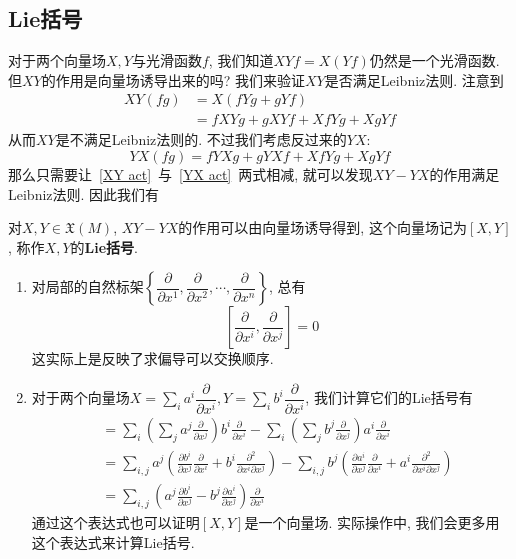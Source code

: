 \subsection*{Lie括号}
对于两个向量场$X,Y$与光滑函数$f$, 我们知道$XYf=X(Yf)$仍然是一个光滑函数.
但$XY$的作用是向量场诱导出来的吗?
我们来验证$XY$是否满足Leibniz法则.
注意到
\begin{equation}
    \begin{aligned}
        XY(fg)&=X(fYg+gYf)\\
        &=fXYg+gXYf+XfYg+XgYf
    \end{aligned}\label{XY act}
\end{equation}
从而$XY$是不满足Leibniz法则的.
不过我们考虑反过来的$YX$:
\begin{equation}
    YX(fg)=fYXg+gYXf+XfYg+XgYf\label{YX act}
\end{equation}
那么只需要让~\eqref{XY act}~与~\eqref{YX act}~两式相减, 就可以发现$XY-YX$的作用满足Leibniz法则.
因此我们有
\begin{prop}
    对$X,Y\in\mathfrak{X}(M)$, $XY-YX$的作用可以由向量场诱导得到, 这个向量场记为$[X,Y]$, 称作$X,Y$的\textbf{Lie括号}.
\end{prop}
\begin{eg}
    \begin{enumerate}[(1)]
        \item 对局部的自然标架$\left\{\dfrac{\partial}{\partial x^1},\dfrac{\partial}{\partial x^2},\cdots,\dfrac{\partial}{\partial x^n}\right\}$, 总有
        \[\left[\frac{\partial}{\partial x^i},\frac{\partial}{\partial x^j}\right]=0\]
        这实际上是反映了求偏导可以交换顺序.
        \item 对于两个向量场$\displaystyle X=\sum_{i}a^i\dfrac{\partial}{\partial x^i},Y=\sum_{i}b^i\dfrac{\partial}{\partial x^i}$, 我们计算它们的Lie括号有
        \begin{align*}
            [X,Y]&=\sum_{i}\left(\sum_{j}a^j\frac{\partial}{\partial x^j}\right)b^i\frac{\partial}{\partial x^i}-\sum_{i}\left(\sum_{j}b^j\frac{\partial}{\partial x^j}\right)a^i\frac{\partial}{\partial x^i}\\
            &=\sum_{i,j}a^j\left(\frac{\partial b^i}{\partial x^j}\frac{\partial}{\partial x^i}+b^i\frac{\partial^2}{\partial x^i\partial x^j}\right)-\sum_{i,j}b^j\left(\frac{\partial a^i}{\partial x^j}\frac{\partial}{\partial x^i}+a^i\frac{\partial^2}{\partial x^i\partial x^j}\right)\\
            &=\sum_{i,j}\left(a^j\frac{\partial b^i}{\partial x^j}-b^j\frac{\partial a^i}{\partial x^j}\right)\frac{\partial}{\partial x^i}
        \end{align*}
        通过这个表达式也可以证明$[X,Y]$是一个向量场.
        实际操作中, 我们会更多用这个表达式来计算Lie括号.
    \end{enumerate}
\end{eg}

